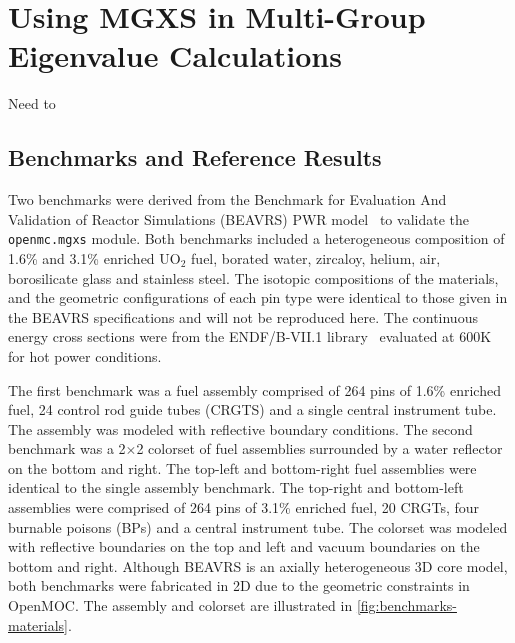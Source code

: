 \section{Using MGXS in Multi-Group Eigenvalue Calculations}
\label{sec:evaluation}

Need to


\subsection{Benchmarks and Reference Results}
\label{subsec:benchmarks}

Two benchmarks were derived from the Benchmark for Evaluation And Validation of Reactor Simulations (BEAVRS) PWR model~\cite{horelik2013beavrs} to validate the \texttt{openmc.mgxs} module. Both benchmarks included a heterogeneous composition of 1.6\% and 3.1\% enriched UO$_2$ fuel, borated water, zircaloy, helium, air, borosilicate glass and stainless steel. The isotopic compositions of the materials, and the geometric configurations of each pin type were identical to those given in the BEAVRS specifications and will not be reproduced here. The continuous energy cross sections were from the ENDF/B-VII.1 library~\cite{mcnpx2003manual} evaluated at 600K for hot power conditions.

The first benchmark was a fuel assembly comprised of 264 pins of 1.6\% enriched fuel, 24 control rod guide tubes (CRGTS) and a single central instrument tube. The assembly was modeled with reflective boundary conditions. The second benchmark was a 2$\times$2 colorset of fuel assemblies surrounded by a water reflector on the bottom and right. The top-left and bottom-right fuel assemblies were identical to the single assembly benchmark. The top-right and bottom-left assemblies were comprised of 264 pins of 3.1\% enriched fuel, 20 CRGTs, four burnable poisons (BPs) and a central instrument tube. The colorset was modeled with reflective boundaries on the top and left and vacuum boundaries on the bottom and right. Although BEAVRS is an axially heterogeneous 3D core model, both benchmarks were fabricated in 2D due to the geometric constraints in OpenMOC. The assembly and colorset are illustrated in \autoref{fig:benchmarks-materials}.

